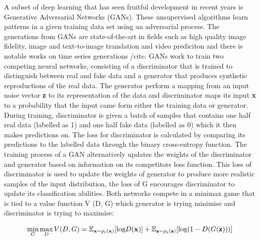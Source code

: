 \documentclass[12pt]{iopart}
\begin{document}

A subset of deep learning that has seen fruitful development in recent years \cite{} is Generative Adversarial Networks (GANs). These unsupervised algorithms learn patterns in a given training data set using an adversarial process. The generations from GANs are state-of-the-art in fields such as high quality image fidelity, image and text-to-image translation and video prediciton \cite{} and there is notable works on time series generations /cite. 
GANs work to train two competing neural networks, consisting of a discriminator  that is trained to distinguish
between real and fake data and a generator that produces synthetic
reproductions of the real data. The generator perform a mapping
from an input noise vector \textbf{z} to its representation of the data and discriminator  maps its
input \textbf{x} to a probability that the input came form either the training
data or generator.  During training, discriminator  is given a batch of samples that contains one half real data (labelled as 1)
and one half fake data (labelled as 0) which it then makes predictions on. The
loss for discriminator  is calculated by comparing its predictions to the labelled data through the binary cross-entropy function. The training process
of a GAN alternatively updates the weights of the discriminator  and generator based on information
on its competitors loss function. This loss of discriminator  is used to update the weights
of generator to produce more realistic samples of the input distribution, the loss of G
encourages discriminator  to update its classification abilities. Both networks compete
in a minimax game that is tied to a value function V (D, G) which generator is trying
minimise and discriminator  is trying to maximise:

\begin{equation}
\mathop{\text{min}}_{G}  \mathop{\text{max}}_{D} V(D,G) = \mathbb{E}_{\mathbf{x} \sim p_{\text{r}}(\mathbf{x})} [\text{log} D(\mathbf{x})] \\ + \mathbb{E}_{\mathbf{z} \sim p_{\text{z}}(\mathbf{z})} [\text{log}(1-D(G(\mathbf{z})))]
\label{equation:GANloss}
\end{equation}
\end{document}
